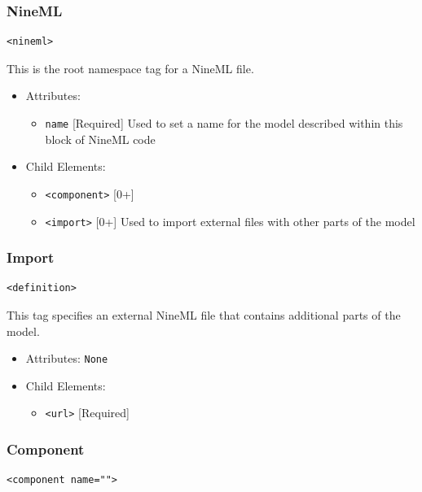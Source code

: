 \documentclass[draftspec]{ninemlspec}
\begin{document}
\subsubsection{NineML}
%
\begin{lstlisting}
<nineml>
\end{lstlisting}

This is the root namespace tag for a NineML file.

\begin{itemize}
\item Attributes:
%
\begin{itemize}
\item \verb|name| {[}Required{]} Used to set a name for the model
described within this block of NineML code
\end{itemize}

\item Child Elements:
%
\begin{itemize}
\item \verb|<component>| {[}0+{]}
\item \verb|<import>| {[}0+{]} Used to import external files with
other parts of the model
\end{itemize}

\end{itemize}

\subsubsection{Import}
%
\begin{lstlisting}
<definition>
\end{lstlisting}

This tag specifies an external NineML file that contains additional
parts of the model.

\begin{itemize}
\item Attributes: \texttt{None}

\item Child Elements:
%
\begin{itemize}
\item \verb|<url>| {[}Required{]}
\end{itemize}

\end{itemize}

\subsubsection{Component}
%
\begin{lstlisting}
<component name="">
\end{lstlisting}
\end{document}
